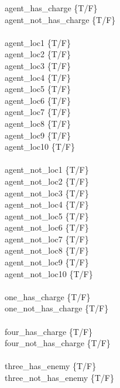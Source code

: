 \documentclass{article}
\def\ans#1{{\color{ans}#1}}
\begin{document}
\begin{enumerate}[label=(\alph*)]
    \ans{
    		\begin{multicols}{2}
                agent\_has\_charge \{T/F\} \\
                agent\_not\_has\_charge \{T/F\} \\ \\
                agent\_loc1   \{T/F\} \\
                agent\_loc2   \{T/F\} \\
                agent\_loc3   \{T/F\} \\
                agent\_loc4   \{T/F\} \\
                agent\_loc5   \{T/F\} \\
                agent\_loc6   \{T/F\} \\
                agent\_loc7   \{T/F\} \\
                agent\_loc8   \{T/F\} \\
                agent\_loc9   \{T/F\} \\
                agent\_loc10   \{T/F\} \\ \\
                agent\_not\_loc1   \{T/F\} \\
                agent\_not\_loc2   \{T/F\} \\
                agent\_not\_loc3   \{T/F\} \\
                agent\_not\_loc4   \{T/F\} \\
                agent\_not\_loc5   \{T/F\} \\
                agent\_not\_loc6   \{T/F\} \\
                agent\_not\_loc7   \{T/F\} \\
                agent\_not\_loc8   \{T/F\} \\
                agent\_not\_loc9   \{T/F\} \\
                agent\_not\_loc10   \{T/F\} \\ \\
                one\_has\_charge \{T/F\} \\
                one\_not\_has\_charge \{T/F\} \\ \\
                four\_has\_charge \{T/F\} \\
                four\_not\_has\_charge \{T/F\} \\ \\
                three\_has\_enemy \{T/F\} \\
                three\_not\_has\_enemy \{T/F\} \\ \\

\end{multicols}}
\end{enumerate}
\end{document}
